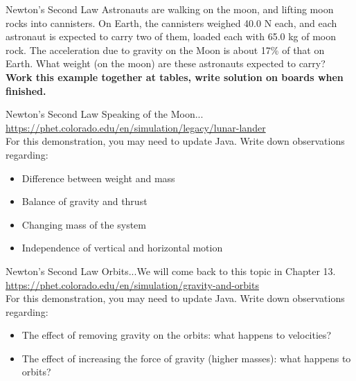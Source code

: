 \documentclass{beamer}
\begin{document}
\begin{frame}{Newton's Second Law}
Astronauts are walking on the moon, and lifting moon rocks into cannisters.  On Earth, the cannisters weighed 40.0 N each, and each astronaut is expected to carry two of them, loaded each with 65.0 kg of moon rock.  The acceleration due to gravity on the Moon is about 17\% of that on Earth.  What weight (on the moon) are these astronauts expected to carry? \\ \vspace{1cm}
\textbf{Work this example together at tables, write solution on boards when finished.}
\end{frame}

\begin{frame}{Newton's Second Law}
Speaking of the Moon... \\
\vspace{1cm}
\url{https://phet.colorado.edu/en/simulation/legacy/lunar-lander} \\
\vspace{1cm}
For this demonstration, you may need to update Java.  Write down observations regarding:
\begin{itemize}
\item Difference between weight and mass
\item Balance of gravity and thrust
\item Changing mass of the system
\item Independence of vertical and horizontal motion
\end{itemize}
\end{frame}

\begin{frame}{Newton's Second Law}
Orbits...We will come back to this topic in Chapter 13. \\
\vspace{1 cm}
\url{https://phet.colorado.edu/en/simulation/gravity-and-orbits} \\
\vspace{1 cm}
For this demonstration, you may need to update Java.  Write down observations regarding:
\begin{itemize}
\item The effect of removing gravity on the orbits: what happens to velocities?
\item The effect of increasing the force of gravity (higher masses): what happens to orbits?
\end{itemize}
\end{frame}
\end{document}
